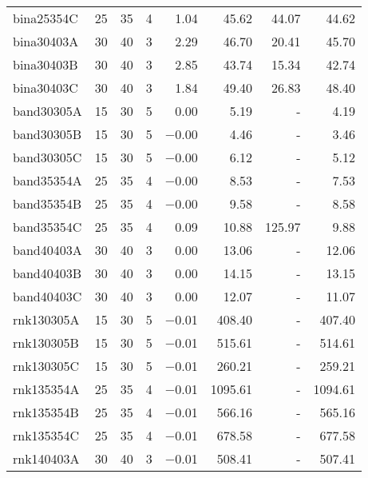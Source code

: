 \begin{scriptsize}
\begin{xtabular*}{\linewidth}{@{\extracolsep{\fill}}lrrrrrrr@{}}
bina25354C & \num{25} & \num{35} & \num{4} & \num{1.04} & \num{45.62} & \num{44.07} & \num{44.62} \\ 
bina30403A & \num{30} & \num{40} & \num{3} & \num{2.29} & \num{46.70} & \num{20.41} & \num{45.70} \\ 
bina30403B & \num{30} & \num{40} & \num{3} & \num{2.85} & \num{43.74} & \num{15.34} & \num{42.74} \\ 
bina30403C & \num{30} & \num{40} & \num{3} & \num{1.84} & \num{49.40} & \num{26.83} & \num{48.40} \\ 
band30305A & \num{15} & \num{30} & \num{5} & \num{0.00} & \num{5.19} & - & \num{4.19} \\ 
band30305B & \num{15} & \num{30} & \num{5} & \num{-0.00} & \num{4.46} & - & \num{3.46} \\ 
band30305C & \num{15} & \num{30} & \num{5} & \num{-0.00} & \num{6.12} & - & \num{5.12} \\ 
band35354A & \num{25} & \num{35} & \num{4} & \num{-0.00} & \num{8.53} & - & \num{7.53} \\ 
band35354B & \num{25} & \num{35} & \num{4} & \num{-0.00} & \num{9.58} & - & \num{8.58} \\ 
band35354C & \num{25} & \num{35} & \num{4} & \num{0.09} & \num{10.88} & \num{125.97} & \num{9.88} \\ 
band40403A & \num{30} & \num{40} & \num{3} & \num{0.00} & \num{13.06} & - & \num{12.06} \\ 
band40403B & \num{30} & \num{40} & \num{3} & \num{0.00} & \num{14.15} & - & \num{13.15} \\ 
band40403C & \num{30} & \num{40} & \num{3} & \num{0.00} & \num{12.07} & - & \num{11.07} \\ 
rnk130305A & \num{15} & \num{30} & \num{5} & \num{-0.01} & \num{408.40} & - & \num{407.40} \\ 
rnk130305B & \num{15} & \num{30} & \num{5} & \num{-0.01} & \num{515.61} & - & \num{514.61} \\ 
rnk130305C & \num{15} & \num{30} & \num{5} & \num{-0.01} & \num{260.21} & - & \num{259.21} \\ 
rnk135354A & \num{25} & \num{35} & \num{4} & \num{-0.01} & \num{1095.61} & - & \num{1094.61} \\ 
rnk135354B & \num{25} & \num{35} & \num{4} & \num{-0.01} & \num{566.16} & - & \num{565.16} \\ 
rnk135354C & \num{25} & \num{35} & \num{4} & \num{-0.01} & \num{678.58} & - & \num{677.58} \\ 
rnk140403A & \num{30} & \num{40} & \num{3} & \num{-0.01} & \num{508.41} & - & \num{507.41} \\ 

\end{xtabular*}
\end{scriptsize}
